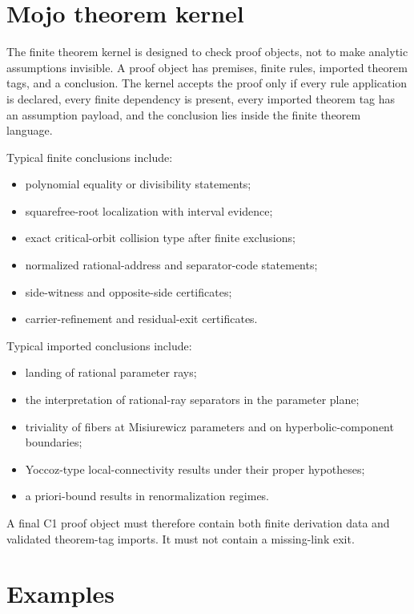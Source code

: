 \documentclass[11pt]{amsart}
\begin{document}
\section{Mojo theorem kernel}

The finite theorem kernel is designed to check proof objects, not to make analytic assumptions invisible.  A proof object has premises, finite rules, imported theorem tags, and a conclusion.  The kernel accepts the proof only if every rule application is declared, every finite dependency is present, every imported theorem tag has an assumption payload, and the conclusion lies inside the finite theorem language.

Typical finite conclusions include:
\begin{itemize}
\item polynomial equality or divisibility statements;
\item squarefree-root localization with interval evidence;
\item exact critical-orbit collision type after finite exclusions;
\item normalized rational-address and separator-code statements;
\item side-witness and opposite-side certificates;
\item carrier-refinement and residual-exit certificates.
\end{itemize}

Typical imported conclusions include:
\begin{itemize}
\item landing of rational parameter rays;
\item the interpretation of rational-ray separators in the parameter plane;
\item triviality of fibers at Misiurewicz parameters and on hyperbolic-component boundaries;
\item Yoccoz-type local-connectivity results under their proper hypotheses;
\item a priori-bound results in renormalization regimes.
\end{itemize}

A final C1 proof object must therefore contain both finite derivation data and validated theorem-tag imports.  It must not contain a missing-link exit.

\section{Examples}
\end{document}
